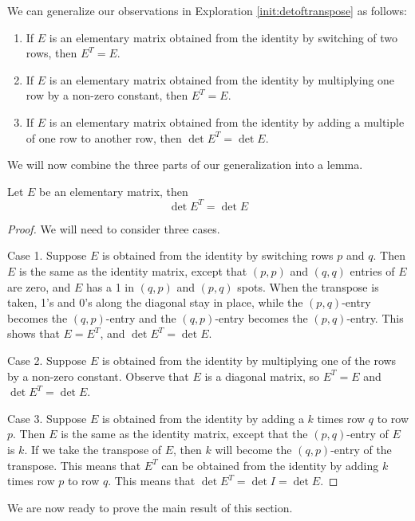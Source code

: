\documentclass{ximera}
\begin{document}
 We can generalize our observations in Exploration \ref{init:detoftranspose} as follows:
\begin{enumerate}
\item If $E$ is an elementary matrix obtained from the identity by switching of two rows, then $E^T=E$.
\item If $E$ is an elementary matrix obtained from the identity by multiplying one row by a non-zero constant, then $E^T=E$.
\item If $E$ is an elementary matrix obtained from the identity by adding a multiple of one row to another row, then $\det{E^T}=\det{E}$.
\end{enumerate}


We will now combine the three parts of our generalization into a lemma.

\begin{lemma}\label{lemma:detofelementarymat}
Let $E$ be an elementary matrix, then
$$\det{E^T}=\det{E}$$
\end{lemma}

\begin{proof}
We will need to consider three cases.

Case 1.  Suppose $E$ is obtained from the identity by switching rows $p$ and $q$.  Then $E$ is the same as the identity matrix, except that $(p,p)$ and $(q, q)$ entries of $E$ are zero, and $E$ has a 1 in $(q, p)$ and $(p, q)$ spots.  When the transpose is taken, 1's and 0's along the diagonal stay in place, while the $(p,q)$-entry becomes the $(q, p)$-entry and the $(q,p)$-entry becomes the $(p,q)$-entry.  This shows that $E=E^T$, and $\det{E^T}=\det{E}$.

Case 2.  Suppose $E$ is obtained from the identity by multiplying one of the rows by a non-zero constant.  Observe that $E$ is a diagonal matrix, so $E^T=E$ and $\det{E^T}=\det{E}$.

Case 3.  Suppose $E$ is obtained from the identity by adding a $k$ times row $q$ to row $p$.  Then $E$ is the same as the identity matrix, except that the $(p,q)$-entry of $E$ is $k$.  If we take the transpose of $E$, then $k$ will become the $(q,p)$-entry of the transpose.  This means that $E^T$ can be obtained from the identity by adding $k$ times row $p$ to row $q$.  This means that $\det{E^T}=\det{I}=\det{E}$.
\end{proof}

We are now ready to prove the main result of this section.
\end{document}
